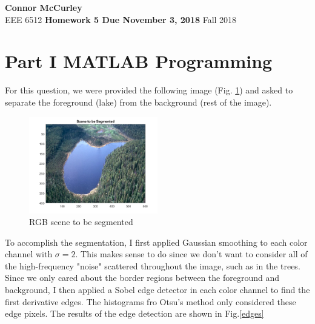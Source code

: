 \documentclass{article}[12 pt]
\begin{document}
	
\begin{center}
	\textbf{\Large Connor McCurley} \\
	EEE 6512 \qquad \textbf{\large Homework 5 Due November 3, 2018} \qquad Fall 2018 
\end{center}

\section*{Part I MATLAB Programming}

For this question, we were provided the following image (Fig. \ref{scene}) and asked to separate the foreground (lake) from the background (rest of the image). 
\begin{center}
	\begin{figure}[H]
		\centering
		\includegraphics[width = 0.5\textwidth]{Images/scene.png}
		\caption{RGB scene to be segmented}
		\label{scene}
	\end{figure}
\end{center}

\noindent
To accomplish the segmentation, I first applied Gaussian smoothing to each color channel with $\sigma=2$.  This makes sense to do since we don't want to consider all of the high-frequency "noise" scattered throughout the image, such as in the trees.  Since we only cared about the border regions between the foreground and background, I then applied a Sobel edge detector in each color channel to find the first derivative edges.  The histograms fro Otsu's method only considered these edge pixels. The results of the edge detection are shown in Fig.\ref{edges}
\end{document}
